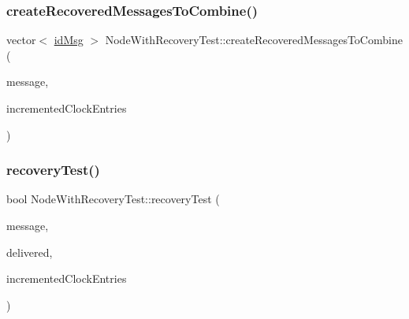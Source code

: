 \subsubsection{\texorpdfstring{create\+Recovered\+Messages\+To\+Combine()}{createRecoveredMessagesToCombine()}}
{\footnotesize\ttfamily vector$<$ \hyperlink{structures_8h_a83a1d9a070efa5341da84cfd8e28d3e5}{id\+Msg} $>$ Node\+With\+Recovery\+Test\+::create\+Recovered\+Messages\+To\+Combine (\begin{DoxyParamCaption}\item[{const \hyperlink{structures_8h_a7e7bdc1d2fff8a9436f2f352b2711ed6}{message\+Info} \&}]{message,  }\item[{const vector$<$ unsigned int $>$ \&}]{incremented\+Clock\+Entries }\end{DoxyParamCaption})\hspace{0.3cm}{\ttfamily [protected]}}

\mbox{\label{class_node_with_recovery_test_a8e4f79eeb8c415ceca21b82f22eb9038}} 
\subsubsection{\texorpdfstring{recovery\+Test()}{recoveryTest()}}
{\footnotesize\ttfamily bool Node\+With\+Recovery\+Test\+::recovery\+Test (\begin{DoxyParamCaption}\item[{const \hyperlink{structures_8h_a7e7bdc1d2fff8a9436f2f352b2711ed6}{message\+Info} \&}]{message,  }\item[{const vector$<$ \hyperlink{structures_8h_a7e7bdc1d2fff8a9436f2f352b2711ed6}{message\+Info} $>$ \&}]{delivered,  }\item[{const vector$<$ unsigned int $>$ \&}]{incremented\+Clock\+Entries }\end{DoxyParamCaption})\hspace{0.3cm}{\ttfamily [protected]}}

\mbox{\label{class_node_with_recovery_test_af9b78d0ed4fefb97e2f54c9279aa4655}} 
